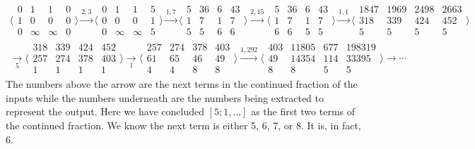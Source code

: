 \documentclass[12pt]{article}
\theoremstyle{remark}
\begin{document}
\begin{multline*}
\big\langle\begin{smallmatrix}
  0 & 1 & 1 & 0\\
  1 & 0 & 0 & 0\\
  0 & \infty & \infty & 0
\end{smallmatrix}\big\rangle
\xrightarrow{2, 3}
\big\langle\begin{smallmatrix}
  0 & 1 & 1 & 5\\
  0 & 0 & 0 & 1\\
  0 & \infty & \infty & 5 
\end{smallmatrix}\big\rangle
\xrightarrow{1, 7}
\big\langle\begin{smallmatrix}
  5 & 36 & 6 & 43\\
  1 & 7 & 1 & 7\\
  5 & 5 & 6 & 6 
\end{smallmatrix}\big\rangle
\xrightarrow{2, 15}
\big\langle\begin{smallmatrix}
  5 & 36 & 6 & 43\\
  1 & 7 & 1 & 7 \\
  6 & 6 & 5 & 5 
\end{smallmatrix}\big\rangle
\xrightarrow{1, 1}
\big\langle\begin{smallmatrix}
  1847 & 1969 & 2498 & 2663\\
  318 & 339 & 424 & 452 \\
  5 & 5 & 5 & 5 
\end{smallmatrix}\big\rangle \\
\xrightarrow[5]{}
\big\langle\begin{smallmatrix}
  318 &339 & 424  & 452\\
  257 & 274 & 378 & 403 \\
  1 & 1 & 1 & 1
\end{smallmatrix}\big\rangle
\xrightarrow[1]{}
\big\langle\begin{smallmatrix}
  257 &274 & 378  & 403\\
  61 & 65 & 46 & 49 \\
  4 & 4 & 8 & 8
\end{smallmatrix}\big\rangle
\xrightarrow{1, 292}
\big\langle\begin{smallmatrix}
  403 & 11805 & 677 & 198319 \\
  49 & 14354 & 114 & 33395 \\
  8 & 8 & 5 & 5 
\end{smallmatrix}\big\rangle
\xrightarrow{}\cdots
\end{multline*}
The numbers above the arrow are the next terms in the continued fraction of the inputs while the numbers underneath are the numbers being extracted to represent the output. Here we have concluded $[5; 1, \ldots]$ as the first two terms of the continued fraction. We know the next term is either 5, 6, 7, or 8. It is, in fact, 6. 
\end{document}
